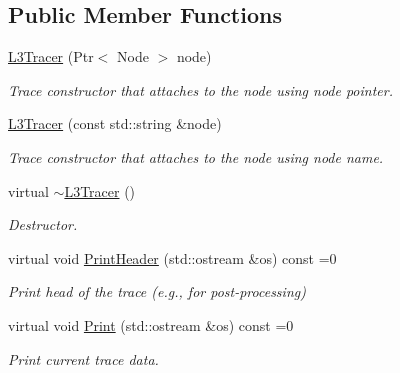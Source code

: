 \subsection*{Public Member Functions}
\begin{DoxyCompactItemize}
\item 
\hyperlink{classns3_1_1ndn_1_1L3Tracer_a15efa2835cfdaf9f5f2111d6e49cf958}{L3\+Tracer} (Ptr$<$ Node $>$ node)
\begin{DoxyCompactList}\small\item\em Trace constructor that attaches to the node using node pointer. \end{DoxyCompactList}\item 
\hyperlink{classns3_1_1ndn_1_1L3Tracer_a88b138d7150da2502e6e8739e7b4230e}{L3\+Tracer} (const std\+::string \&node)
\begin{DoxyCompactList}\small\item\em Trace constructor that attaches to the node using node name. \end{DoxyCompactList}\item 
virtual \hyperlink{classns3_1_1ndn_1_1L3Tracer_a9e84682d3049ff8be7049d247c13b2c9}{$\sim$\+L3\+Tracer} ()\hypertarget{classns3_1_1ndn_1_1L3Tracer_a9e84682d3049ff8be7049d247c13b2c9}{}\label{classns3_1_1ndn_1_1L3Tracer_a9e84682d3049ff8be7049d247c13b2c9}

\begin{DoxyCompactList}\small\item\em Destructor. \end{DoxyCompactList}\item 
virtual void \hyperlink{classns3_1_1ndn_1_1L3Tracer_a899a814836ce179c610c469a7f3889e4}{Print\+Header} (std\+::ostream \&os) const =0
\begin{DoxyCompactList}\small\item\em Print head of the trace (e.\+g., for post-\/processing) \end{DoxyCompactList}\item 
virtual void \hyperlink{classns3_1_1ndn_1_1L3Tracer_a1302456f491afcb016b8b0c7121bdaf0}{Print} (std\+::ostream \&os) const =0
\begin{DoxyCompactList}\small\item\em Print current trace data. \end{DoxyCompactList}\end{DoxyCompactItemize}
